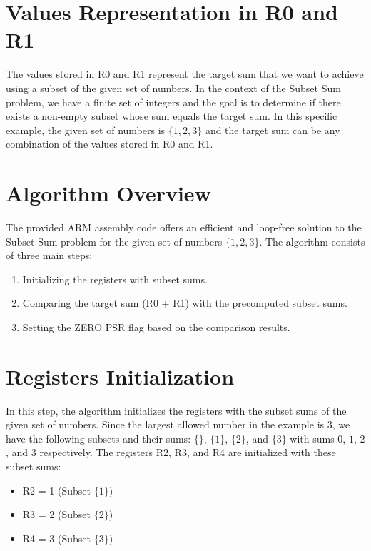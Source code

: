 \section{Values Representation in R0 and R1}

The values stored in R0 and R1 represent the target sum that we want to achieve using a subset of the given set of numbers. In the context of the Subset Sum problem, we have a finite set of integers and the goal is to determine if there exists a non-empty subset whose sum equals the target sum. In this specific example, the given set of numbers is $\{1, 2, 3\}$ and the target sum can be any combination of the values stored in R0 and R1.

\section{Algorithm Overview}

The provided ARM assembly code offers an efficient and loop-free solution to the Subset Sum problem for the given set of numbers $\{1, 2, 3\}$. The algorithm consists of three main steps:

\begin{enumerate}
    \item Initializing the registers with subset sums.
    \item Comparing the target sum (R0 + R1) with the precomputed subset sums.
    \item Setting the ZERO PSR flag based on the comparison results.
\end{enumerate}

\section{Registers Initialization}

In this step, the algorithm initializes the registers with the subset sums of the given set of numbers. Since the largest allowed number in the example is 3, we have the following subsets and their sums: $\{\}$, $\{1\}$, $\{2\}$, and $\{3\}$ with sums $0$, $1$, $2$, and $3$ respectively. The registers R2, R3, and R4 are initialized with these subset sums:

\begin{itemize}
    \item R2 = 1 (Subset $\{1\}$)
    \item R3 = 2 (Subset $\{2\}$)
    \item R4 = 3 (Subset $\{3\}$)
\end{itemize}

